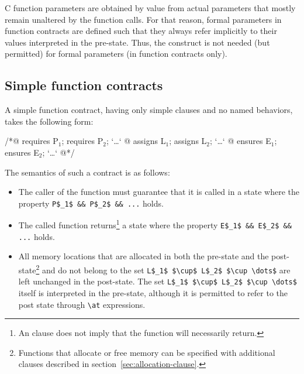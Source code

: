 

C function parameters are obtained by
value from actual parameters that mostly remain unaltered by the
function calls. For that reason, formal parameters in function
contracts are defined such that they always refer implicitly to their
values interpreted in the pre-state.
Thus, the \old construct is not needed (but permitted) for formal parameters (in
function contracts only).

\subsection{Simple function contracts}
\label{sec:simplecontracts}

A simple function contract, having only simple clauses and no named behaviors, takes the following
form:
\begin{listing}{1}
/*@ requires P$_1$; requires P$_2$; `\dots`
  @ assigns L$_1$;  assigns L$_2$;  `\dots`
  @ ensures E$_1$;  ensures E$_2$;  `\dots`
  @*/
\end{listing}
The semantics of such a contract is as follows:
\begin{itemize}
\item The caller of the function must guarantee that it is called in a
  state where the property \lstinline|P$_1$ && P$_2$ && ...| holds.
\item The called function returns\footnote{An \ensures{} clause does not
  imply that the function will necessarily return.} a state where the property
  \lstinline|E$_1$ && E$_2$ && ...| holds.
\item All memory locations that are allocated in both the pre-state and 
  the post-state\footnote{Functions that allocate or free memory can be 
    specified with additional clauses described in
    section~\ref{sec:allocation-clause}.} 
  and do not belong to the
  set \lstinline|L$_1$ $\cup$ L$_2$ $\cup \dots$| are left unchanged in the
  post-state. The set \lstinline|L$_1$ $\cup$ L$_2$ $\cup \dots$| 
  itself is interpreted in the pre-state, although it is permitted to 
  refer to the post state through \lstinline|\at| expressions.
\end{itemize}

